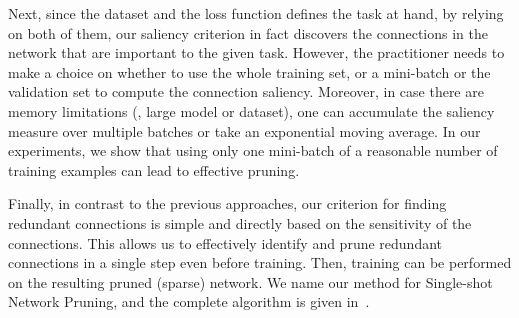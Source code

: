 Next, since the dataset and the loss function defines the task at hand, by relying on both of them, our saliency criterion in fact discovers the connections in the network that are important to the given task.
However, the practitioner needs to make a choice on whether to use the whole training set, or a mini-batch or the validation set to compute the connection saliency.
Moreover, in case there are memory limitations (\eg, large model or dataset), one can accumulate the saliency measure over multiple batches or take an exponential moving average. 
In our experiments, we show that using only one mini-batch of a reasonable number of training examples can lead to effective pruning.
  


Finally, in contrast to the previous approaches, our criterion for finding redundant connections is simple and directly based on the sensitivity of the connections.
This allows us to effectively identify and prune redundant connections in a single step even before training.
Then, training can be performed on the resulting pruned (sparse) network.
We name our method \snip{} for Single-shot Network Pruning, and the complete algorithm is given in~.






